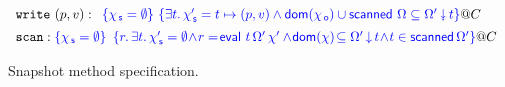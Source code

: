 \begin{figure}[t]
%
\centering
\[
\begin{array}{l}
\mathtt{write}\ (p, v) : %
\begin{array}[t]{l}
\tsPre{\{\histS = \hempty\}}\
\tsPos{\{\exists t\ldot \histS' = t \mapsto (p, v) \wedge
    \dom {\histO} \cup \scanned\, \stableorder
       \subseteq \sideal{\stableorderP}{t}\}} @ C %
\end{array}\\[5pt]
%
\mathtt{scan} : 
\tsPre{\{\histS = \hempty\}}\ 
\!\!\begin{array}[t]{l}
\tsPos{\{r\ldot \exists t\ldot \histSP = \hempty\! \wedge\!
   r =\! \eval\ t\, {\stableorderP}\, {\histP} \wedge\!
  \dom{\hist}\! \subseteq \ideal{\stableorderP}{t}\! \wedge\!
  t \in \scanned{\stableorderP}\}} @ C %
\end{array}
\end{array}
\]
\caption{\label{fig:specs} Snapshot method specification. 
}
\end{figure}



